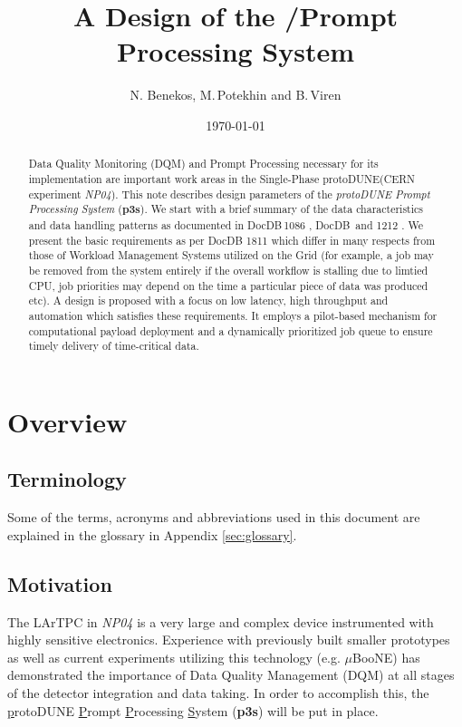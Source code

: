 \documentclass[pdftex,12pt,letter]{article}
\title{A Design of the \pd/\expname Prompt Processing System}
\date{\today}
\author{N. Benekos, M.\,Potekhin and B.\,Viren}
\newcommand{\pd}{protoDUNE\xspace}
\newcommand{\expname}{\textit{NP04}\xspace}
\newcommand{\PP}{Prompt Processing\xspace}
\newcommand{\PPS}{\textbf{p3s}\xspace}
\begin{document}
\maketitle

\begin{abstract}
\noindent  Data Quality Monitoring (DQM) and \PP necessary for its implementation
are important work areas  in the Single-Phase \pd (CERN experiment \expname).
This note describes design parameters of the \textit{\pd Prompt Processing System} (\PPS).
 We start with a brief summary of the data characteristics
and data handling patterns as documented in DocDB\,1086 \cite{docdb1086}, DocDB\ and
1212 \cite{docdb1212}. We present the basic requirements as per  DocDB 1811 \cite{docdb1811}
which differ in many  respects from those of Workload Management
Systems utilized on the Grid (for example, a job may be removed from the system entirely
if the overall workflow is stalling due to limtied CPU, job priorities may depend on
the time a particular piece of data was produced etc). A design is proposed with a focus
on low latency, high throughput and automation which satisfies these requirements. It employs a pilot-based mechanism for
computational payload deployment and a dynamically prioritized job queue to ensure timely
delivery of time-critical data.
\end{abstract}


\section{Overview}
\subsection{Terminology}
Some of the terms, acronyms and abbreviations used in this document are explained in the glossary in Appendix \ref{sec:glossary}.

\subsection{Motivation}
The LArTPC in \expname is a very large and complex device instrumented with highly sensitive electronics.
Experience with previously built smaller prototypes as well as current experiments utilizing this technology
(e.g. $\mu$BooNE) has demonstrated the importance of Data Quality Management (DQM) at all stages of
the detector integration and data taking. In order to accomplish this, the \underline{p}rotoDUNE
\underline{P}rompt \underline{P}rocessing \underline{S}ystem (\textbf{p3s}) will be put in place.
\end{document}
